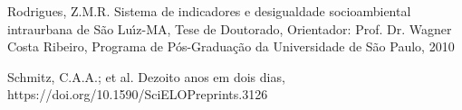 \documentclass[
12pt,		%
openright,	%
twoside,  %
a4paper,			%
chapter=TITLE,		%
english,			%
french,				%
spanish,			%
brazil				%
]{USPSC-classe/USPSC}
\begin{document}
\begin{flushleft}
\begin{flushleft}
\begin{flushleft}
\begin{flushleft}
\begin{flushleft}
\begin{flushleft}
\begin{flushleft}
\begin{flushleft}
\begin{flushleft}
[RODRIGUES, 2010] Rodrigues, Z.M.R. Sistema de indicadores e desigualdade socioambiental intraurbana de S\~ao Lu\'{\i}z-MA, Tese de Doutorado, Orientador: Prof. Dr. Wagner Costa Ribeiro, Programa de P\'os-Gradua\c{c}\~ao da Universidade de S\~ao Paulo, 2010
\end{flushleft}


\end{flushleft}


\end{flushleft}


\end{flushleft}


\end{flushleft}


\end{flushleft}


\end{flushleft}


\end{flushleft}


\end{flushleft}


\begin{flushleft}
\begin{flushleft}
\begin{flushleft}
\begin{flushleft}
\begin{flushleft}
\begin{flushleft}
\begin{flushleft}
\begin{flushleft}
\begin{flushleft}
[SCHMITZ et al., 2021] Schmitz, C.A.A.; et al. Dezoito anos em dois dias, https://doi.org/10.1590/SciELOPreprints.3126
\end{flushleft}


\end{flushleft}


\end{flushleft}


\end{flushleft}


\end{flushleft}


\end{flushleft}


\end{flushleft}


\end{flushleft}


\end{flushleft}
\end{document}
